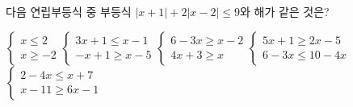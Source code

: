 다음 연립부등식 중 부등식 $|x+1|+2|x-2|\le 9$와 해가 같은 것은?
\begin{choicesii}{$\begin{cases} x\le 2 \\ x\ge -2 \end{cases}$}{$\begin{cases} 3x+1\le x-1 \\ -x+1\ge x-5 \end{cases}$}{$\begin{cases} 6-3x\ge x-2 \\ 4x+3\ge x \end{cases}$}{$\begin{cases} 5x+1\ge 2x-5 \\ 6-3x\le 10-4x \end{cases}$}{$\begin{cases} 2-4x\le x+7 \\ x-11\ge 6x-1 \end{cases}$}\end{choicesii}
